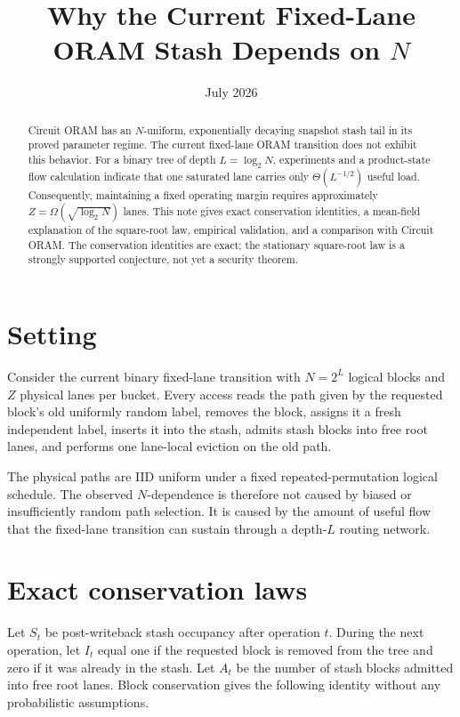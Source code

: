 \documentclass[11pt]{article}
\title{Why the Current Fixed-Lane ORAM Stash Depends on $N$}
\author{}
\date{July 2026}
\begin{document}
\maketitle

\begin{abstract}
Circuit ORAM has an $N$-uniform, exponentially decaying snapshot stash tail
in its proved parameter regime.  The current fixed-lane ORAM transition does
not exhibit this behavior.  For a binary tree of depth
$L=\log_2 N$, experiments and a product-state flow calculation indicate that
one saturated lane carries only $\Theta(L^{-1/2})$ useful load.  Consequently,
maintaining a fixed operating margin requires approximately
$Z=\Omega(\sqrt{\log_2 N})$ lanes.  This note gives exact conservation
identities, a mean-field explanation of the square-root law, empirical
validation, and a comparison with Circuit ORAM.  The conservation identities
are exact; the stationary square-root law is a strongly supported conjecture,
not yet a security theorem.
\end{abstract}

\section{Setting}

Consider the current binary fixed-lane transition with $N=2^L$ logical
blocks and $Z$ physical lanes per bucket.  Every access reads the path given
by the requested block's old uniformly random label, removes the block,
assigns it a fresh independent label, inserts it into the stash, admits stash
blocks into free root lanes, and performs one lane-local eviction on the old
path.

The physical paths are IID uniform under a fixed repeated-permutation logical
schedule.  The observed $N$-dependence is therefore not caused by biased or
insufficiently random path selection.  It is caused by the amount of useful
flow that the fixed-lane transition can sustain through a depth-$L$ routing
network.

\section{Exact conservation laws}

Let $S_t$ be post-writeback stash occupancy after operation $t$.  During the
next operation, let $I_t$ equal one if the requested block is removed from the
tree and zero if it was already in the stash.  Let $A_t$ be the number of
stash blocks admitted into free root lanes.  Block conservation gives the
following identity without any probabilistic assumptions.
\end{document}
